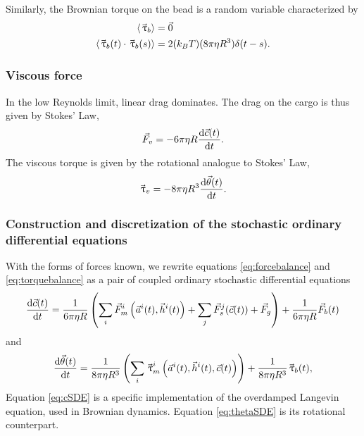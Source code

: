 Similarly, the Brownian torque on the bead is a random variable characterized by
\begin{align} \label{eq:Brownian_torque}
\ev{\vec{\tau}_b} &= \vec{0} \\
\ev{\vec{\tau}_b(t) \cdot \vec{\tau}_b(s)} &= 2 (k_B T)(8 \pi \eta R^3) \delta(t-s).
\end{align}

\subsubsection*{Viscous force}

In the low Reynolds  limit, linear drag dominates. The drag on the cargo is thus given by Stokes' Law,
\begin{equation} \label{eq:trans_drag}
\vec{F}_v=-6 \pi \eta R \dv{\vec{c}(t)}{t}.
\end{equation}
The viscous torque is given by the rotational analogue to Stokes' Law,
\begin{equation} \label{eq:rot_drag}
\vec{{\,\uptau}}_v=-8 \pi \eta R^3 \dv{\vec{\theta}(t)}{t}.
\end{equation}

\subsubsection*{Construction and discretization of the stochastic ordinary differential equations}

With the forms of forces known, we  rewrite equations \ref{eq:forcebalance} and \ref{eq:torquebalance} as a pair of coupled ordinary stochastic differential equations
\begin{equation} \label{eq:cSDE}
\dv{\vec{c}(t)}{t} = 
%
\frac{1}{6 \pi \eta R} \left( 
\sum_i \vec{F}_m^i \left( \vec{a}^i(t) ,\vec{h}^i(t) \right) + 
\sum_j \vec{F}_s^j(\vec{c}(t)) + 
\vec{F}_g 
\right) + 
%
\frac{1}{6 \pi \eta R} \vec{F}_b(t)
\end{equation}
and
\begin{equation} \label{eq:thetaSDE}
\dv{\vec{\theta}(t)}{t}=
%
\frac{1}{8 \pi \eta R^3} \left( 
\sum_i \vec{\tau}_m^i \left( \vec{a}^i(t) ,\vec{h}^i(t) ,\vec{c}(t) \right) 
\right) + 
%
\frac{1}{8 \pi \eta R^3} \vec{\tau}_b(t),
\end{equation}
Equation \ref{eq:cSDE} is a specific implementation of the overdamped Langevin equation, used in Brownian dynamics. Equation \ref{eq:thetaSDE} is its rotational counterpart.

